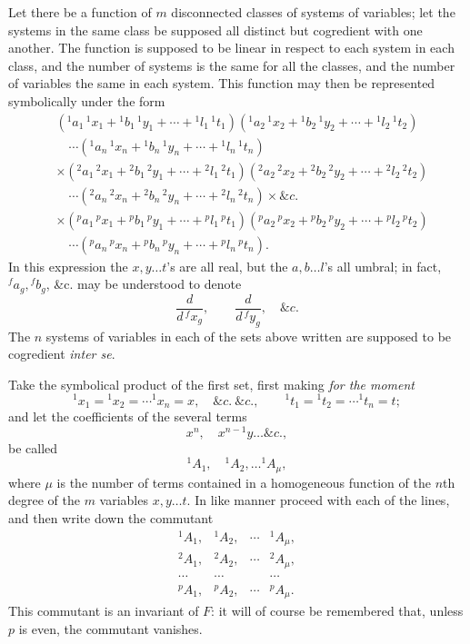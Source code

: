 \documentclass[11pt]{article}
\begin{document}
Let there be a function of $m$ disconnected classes of systems of variables; let the systems in the same class be supposed all distinct but cogredient with one another. The function is supposed to be linear in respect to each system in each class, and the number of systems is the same for all the classes, and the number of variables the same in each system. This function may then be represented symbolically under the form
\[
\begin{aligned}
&({}^{1}a_1\,{}^{1}x_1+{}^{1}b_1\,{}^{1}y_1+\cdots+{}^{1}l_1\,{}^{1}t_1)
({}^{1}a_2\,{}^{1}x_2+{}^{1}b_2\,{}^{1}y_2+\cdots+{}^{1}l_2\,{}^{1}t_2)\\
&\quad\cdots({}^{1}a_n\,{}^{1}x_n+{}^{1}b_n\,{}^{1}y_n+\cdots+{}^{1}l_n\,{}^{1}t_n)\\
&\times({}^{2}a_1\,{}^{2}x_1+{}^{2}b_1\,{}^{2}y_1+\cdots+{}^{2}l_1\,{}^{2}t_1)
({}^{2}a_2\,{}^{2}x_2+{}^{2}b_2\,{}^{2}y_2+\cdots+{}^{2}l_2\,{}^{2}t_2)\\
&\quad\cdots({}^{2}a_n\,{}^{2}x_n+{}^{2}b_n\,{}^{2}y_n+\cdots+{}^{2}l_n\,{}^{2}t_n)\times\&c.\\
&\times({}^{p}a_1\,{}^{p}x_1+{}^{p}b_1\,{}^{p}y_1+\cdots+{}^{p}l_1\,{}^{p}t_1)
({}^{p}a_2\,{}^{p}x_2+{}^{p}b_2\,{}^{p}y_2+\cdots+{}^{p}l_2\,{}^{p}t_2)\\
&\quad\cdots({}^{p}a_n\,{}^{p}x_n+{}^{p}b_n\,{}^{p}y_n+\cdots+{}^{p}l_n\,{}^{p}t_n).
\end{aligned}
\]
In this expression the $x,y\ldots t$'s are all real, but the $a,b\ldots l$'s all umbral; in fact, ${}^{f}a_g,{}^{f}b_g$, \&c. may be understood to denote
\[
\frac{d}{d\,{}^{f}x_g},\qquad \frac{d}{d\,{}^{f}y_g},\quad \&c.
\]
The $n$ systems of variables in each of the sets above written are supposed to be cogredient \emph{inter se}.

Take the symbolical product of the first set, first making \emph{for the moment}
\[
{}^{1}x_1={}^{1}x_2=\cdots{}^{1}x_n=x,\quad \&c.\ \&c.,\qquad
{}^{1}t_1={}^{1}t_2=\cdots{}^{1}t_n=t;
\]
and let the coefficients of the several terms
\[
x^n,\quad x^{n-1}y\ldots \&c.,
\]
be called
\[
{}^{1}A_1,\quad {}^{1}A_2,\ldots{}^{1}A_\mu,
\]
where $\mu$ is the number of terms contained in a homogeneous function of the $n$th degree of the $m$ variables $x,y\ldots t$. In like manner proceed with each of the lines, and then write down the commutant
\[
\begin{array}{cccc}
{}^{1}A_1,&{}^{1}A_2,&\cdots&{}^{1}A_\mu,\\
{}^{2}A_1,&{}^{2}A_2,&\cdots&{}^{2}A_\mu,\\
\cdots&\cdots&&\cdots\\
{}^{p}A_1,&{}^{p}A_2,&\cdots&{}^{p}A_\mu.
\end{array}
\]
This commutant is an invariant of $F$: it will of course be remembered that, unless $p$ is even, the commutant vanishes.
\end{document}
